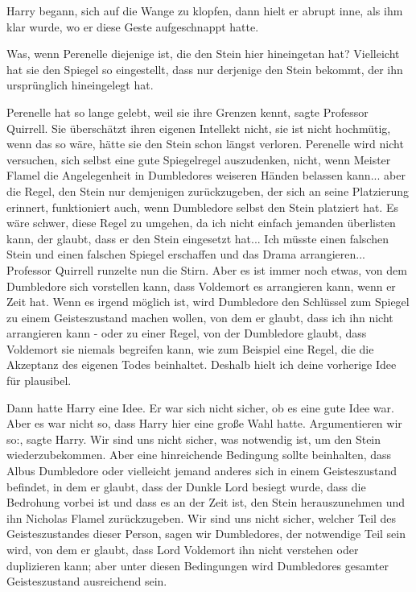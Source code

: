 Harry begann, sich auf die Wange zu klopfen, dann hielt er abrupt inne, als ihm
klar wurde, wo er diese Geste aufgeschnappt hatte.

\glqq{}Was, wenn Perenelle diejenige ist, die den Stein hier hineingetan hat?
Vielleicht hat sie den Spiegel so eingestellt, dass nur derjenige den Stein
bekommt, der ihn ursprünglich hineingelegt hat.\grqq{}

\glqq{}Perenelle hat so lange gelebt, weil sie ihre Grenzen kennt\grqq{}, sagte
Professor Quirrell. \glqq{}Sie überschätzt ihren eigenen Intellekt nicht, sie ist
nicht hochmütig, wenn das so wäre, hätte sie den Stein schon längst verloren.
Perenelle wird nicht versuchen, sich selbst eine gute Spiegelregel auszudenken,
nicht, wenn Meister Flamel die Angelegenheit in Dumbledores weiseren Händen
belassen kann... aber die Regel, den Stein nur demjenigen zurückzugeben, der
sich an seine Platzierung erinnert, funktioniert auch, wenn Dumbledore selbst
den Stein platziert hat. Es wäre schwer, diese Regel zu umgehen, da ich nicht
einfach jemanden überlisten kann, der glaubt, dass er den Stein eingesetzt
hat... Ich müsste einen falschen Stein und einen falschen Spiegel erschaffen und
das Drama arrangieren...\grqq{} Professor Quirrell runzelte nun die Stirn. \glqq{}
Aber es ist immer noch etwas, von dem Dumbledore sich vorstellen kann, dass
Voldemort es arrangieren kann, wenn er Zeit hat. Wenn es irgend möglich ist,
wird Dumbledore den Schlüssel zum Spiegel zu einem Geisteszustand machen wollen,
von dem er glaubt, dass ich ihn nicht arrangieren kann - oder zu einer Regel,
von der Dumbledore glaubt, dass Voldemort sie niemals begreifen kann, wie zum
Beispiel eine Regel, die die Akzeptanz des eigenen Todes beinhaltet. Deshalb
hielt ich deine vorherige Idee für plausibel.\grqq{}

Dann hatte Harry eine Idee. Er war sich nicht sicher, ob es eine gute Idee war.
Aber es war nicht so, dass Harry hier eine große Wahl hatte. \glqq{}Argumentieren
wir so:\grqq{}, sagte Harry. \glqq{}Wir sind uns nicht sicher, was notwendig ist,
um den Stein wiederzubekommen. Aber eine hinreichende Bedingung sollte
beinhalten, dass Albus Dumbledore oder vielleicht jemand anderes sich in einem
Geisteszustand befindet, in dem er glaubt, dass der Dunkle Lord besiegt wurde,
dass die Bedrohung vorbei ist und dass es an der Zeit ist, den Stein
herauszunehmen und ihn Nicholas Flamel zurückzugeben. Wir sind uns nicht sicher,
welcher Teil des Geisteszustandes dieser Person, sagen wir Dumbledores, der
notwendige Teil sein wird, von dem er glaubt, dass Lord Voldemort ihn nicht
verstehen oder duplizieren kann; aber unter diesen Bedingungen wird Dumbledores
gesamter Geisteszustand ausreichend sein.\grqq{}

